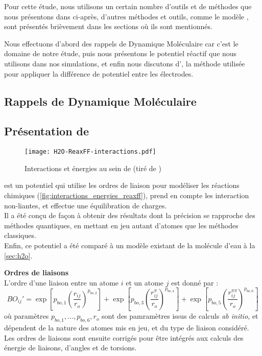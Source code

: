 Pour cette étude, nous utilisons un certain nombre d'outils et de méthodes que nous présentons dans ci-après, d'autres méthodes et outils, comme le modèle \spce{}, sont présentés brièvement dans les sections où ils sont mentionnés.

Nous effectuons d'abord des rappels de Dynamique Moléculaire car c'est le domaine de notre étude, puis nous présentons \reaxff{} le potentiel réactif que nous utilisons dans nos simulations, et enfin nous discutons d'\echemdid{}, la méthode utilisée pour appliquer la différence de potentiel entre les électrodes.

    \subsection{Rappels de Dynamique Moléculaire}



    \subsection{Présentation de \reaxff{}} \label{sec:reaxff}

\begin{figure}[h!]
    \centering
    \texttt{[image: H2O-ReaxFF-interactions.pdf]}
    \caption{Interactions et énergies au sein de \reaxff{} (tiré de \cite{russo_atomistic-scale_2011})}
    \label{fig:interactions_energies_reaxff}
\end{figure}

\reaxff{}\cite{russo_atomistic-scale_2011}\cite{senftle_reaxff_2016} est un potentiel qui utilise les ordres de liaison pour modéliser les réactions chimiques (\autoref{fig:interactions_energies_reaxff}), prend en compte les interaction non-liantes, et effectue  une équilibration de charges.\\
Il a été conçu de façon à obtenir des résultats dont la précision se rapproche des méthodes quantiques, en mettant en jeu autant d'atomes que les méthodes classiques.\\
Enfin, ce potentiel a été comparé à un modèle existant de la molécule d'eau à la \autoref{sec:h2o}.

\textbf{Ordres de liaisons}\\
L'ordre d'une liaison entre un atome $i$ et un atome $j$ est donné par :
\begin{equation}
    BO_{ij}' = \exp \left[p_{bo, 1} \left(\frac{r_{ij}}{r_o}\right)^{p_{bo,2}}\right] + \exp \left[p_{bo,3} \left(\frac{r_{ij}^\pi}{r_o}\right)^{p_{bo,4}}\right] + \exp \left[p_{bo,5} \left(\frac{r_{ij}^{\pi\pi}}{r_o}\right)^{p_{bo,6}}\right]
    \label{eq:ordres_liaisons_reaxff}
\end{equation}
où paramètres $p_{bo,1}, \dots, p_{bo,6}, r_o$ sont des pamramètres issus de calculs \textit{ab initio}, et dépendent de la nature des atomes mis en jeu, et du type de liaison considéré. Les ordres de liaisons sont ensuite corrigés pour être intégrés aux calculs des énergie de liaisons, d'angles et de torsions.

